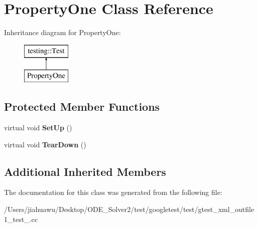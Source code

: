 \hypertarget{class_property_one}{}\section{Property\+One Class Reference}
\label{class_property_one}
Inheritance diagram for Property\+One\+:\begin{figure}[H]
\begin{center}
\leavevmode
\includegraphics[height=2.000000cm]{class_property_one}
\end{center}
\end{figure}
\subsection*{Protected Member Functions}
\begin{DoxyCompactItemize}
\item 
\mbox{\label{class_property_one_a9cb7d7cb508d5f1a6fc7cfead81ebc2b}} 
virtual void {\bfseries Set\+Up} ()
\item 
\mbox{\label{class_property_one_a3ed895113848403d5ea27f52a1bb0545}} 
virtual void {\bfseries Tear\+Down} ()
\end{DoxyCompactItemize}
\subsection*{Additional Inherited Members}


The documentation for this class was generated from the following file\+:\begin{DoxyCompactItemize}
\item 
/\+Users/jiahuawu/\+Desktop/\+O\+D\+E\+\_\+\+Solver2/test/googletest/test/gtest\+\_\+xml\+\_\+outfile1\+\_\+test\+\_\+.\+cc\end{DoxyCompactItemize}
